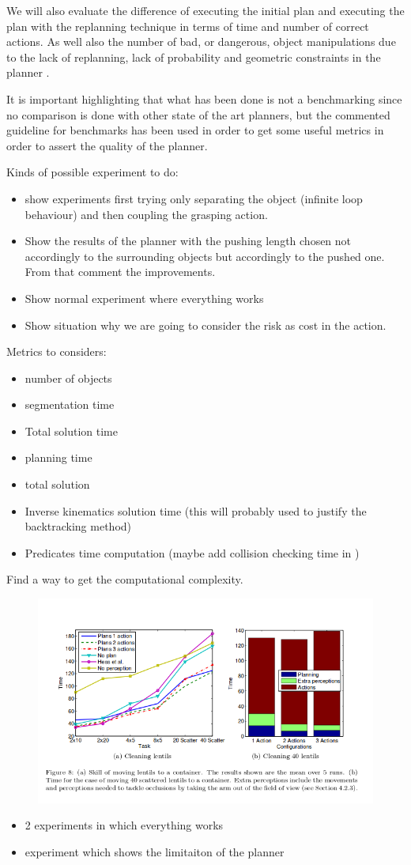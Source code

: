 We will also evaluate the difference of executing the initial plan and executing the plan with the replanning technique in terms of time and number of correct actions. As well also the number of bad, or dangerous, object manipulations due to the lack of replanning, lack of probability and geometric constraints in the planner . 

It is important highlighting that what has been done is not a benchmarking since no comparison is done with other state of the art planners, but the commented guideline for benchmarks has been used in order to get some useful metrics in order to assert the quality of the planner. 

Kinds of possible experiment to do:
\begin{itemize}
\item show experiments first trying only separating the object (infinite loop behaviour) and then coupling the grasping action. 
\item Show the results of the planner with the pushing length chosen not accordingly to the surrounding objects but accordingly to the pushed one. From that comment the improvements.
\item Show normal experiment where everything works
\item Show situation why we are going to consider the risk as cost in the action. 
\end{itemize}

Metrics to considers:
\begin{itemize}
\item number of objects
\item segmentation time
\item Total solution time
\item planning time
\item total solution
\item Inverse kinematics solution time (this will probably used to justify the backtracking method)
\item Predicates time computation (maybe add collision checking time in )
\end{itemize}


Find a way to get the computational complexity. 

\begin{figure}
\centering
\includegraphics[width=\textwidth]{Img/general/experiments.png}
\end{figure}

\begin{itemize}
\item 2 experiments in which everything works
\item experiment which shows the limitaiton of the planner
\end{itemize}
